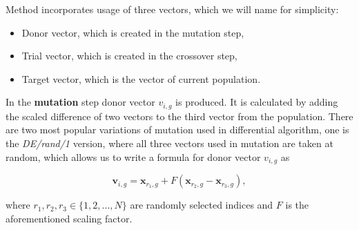 \documentclass[11pt,a4paper,openany]{book}
\begin{document}
\noindent Method incorporates usage of three vectors, which we will name for simplicity:

\begin{itemize}
\item Donor vector, which is created in the mutation step,
\item Trial vector, which is created in the crossover step,
\item Target vector, which is the vector of current population.
\end{itemize}


\noindent In the \textbf{mutation} step donor vector $v_{i, g}$ is produced. It is calculated by adding the scaled difference of two vectors to the third vector from the population. There are two most popular variations of mutation used in differential algorithm, one is the \textit{DE/rand/1} version, where all three vectors used in mutation are taken at random, which allows us to write a formula for donor vector  $v_{i, g}$ as

\begin{equation}
\mathbf{v}_{i, g}=\mathbf{x}_{r_{1}, g}+F\left(\mathbf{x}_{r_{2}, g}-\mathbf{x}_{r_{3}, g}\right),
\end{equation}

\noindent where $r_{1}, r_{2},r_{3} \in \{1, 2, ..., N\}$ are randomly selected indices and $F$ is the aforementioned scaling factor.
\end{document}
